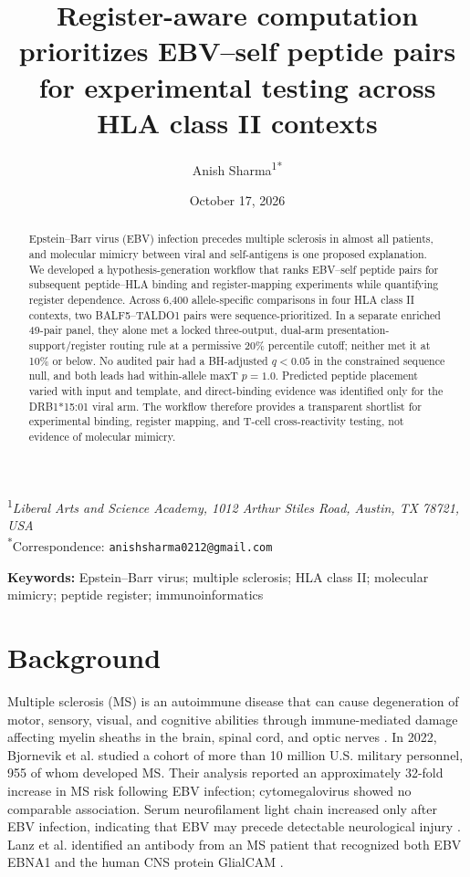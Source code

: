 \documentclass[11pt]{article}
\title{Register-aware computation prioritizes EBV--self peptide pairs for experimental testing across HLA class II contexts}
\author{Anish Sharma\textsuperscript{1*}}
\date{October 17, 2026}
\begin{document}
\maketitle
\begin{center}
\small \textsuperscript{1}\textit{Liberal Arts and Science Academy, 1012 Arthur Stiles Road, Austin, TX 78721, USA}\\
\small \textsuperscript{*}Correspondence: \texttt{anishsharma0212@gmail.com}
\end{center}

\begin{abstract}
Epstein--Barr virus (EBV) infection precedes multiple sclerosis in almost all patients, and molecular mimicry between viral and self-antigens is one proposed explanation. We developed a hypothesis-generation workflow that ranks EBV--self peptide pairs for subsequent peptide--HLA binding and register-mapping experiments while quantifying register dependence. Across 6,400 allele-specific comparisons in four HLA class II contexts, two BALF5--TALDO1 pairs were sequence-prioritized. In a separate enriched 49-pair panel, they alone met a locked three-output, dual-arm presentation-support/register routing rule at a permissive 20\% percentile cutoff; neither met it at 10\% or below. No audited pair had a BH-adjusted $q<0.05$ in the constrained sequence null, and both leads had within-allele maxT $p=1.0$. Predicted peptide placement varied with input and template, and direct-binding evidence was identified only for the DRB1*15:01 viral arm. The workflow therefore provides a transparent shortlist for experimental binding, register mapping, and T-cell cross-reactivity testing, not evidence of molecular mimicry.
\end{abstract}

\noindent\textbf{Keywords:} Epstein--Barr virus; multiple sclerosis; HLA class II; molecular mimicry; peptide register; immunoinformatics

\section{Background}
Multiple sclerosis (MS) is an autoimmune disease that can cause degeneration of motor, sensory, visual, and cognitive abilities through immune-mediated damage affecting myelin sheaths in the brain, spinal cord, and optic nerves \cite{ninds}. In 2022, Bjornevik et al. studied a cohort of more than 10 million U.S. military personnel, 955 of whom developed MS. Their analysis reported an approximately 32-fold increase in MS risk following EBV infection; cytomegalovirus showed no comparable association. Serum neurofilament light chain increased only after EBV infection, indicating that EBV may precede detectable neurological injury \cite{bjornevik}. Lanz et al. identified an antibody from an MS patient that recognized both EBV EBNA1 and the human CNS protein GlialCAM \cite{lanz}.
\end{document}
